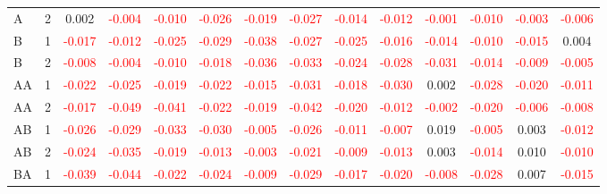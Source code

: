 \begin{table}[H]
{\begin{tabular}{llcccccccccccc}
A & 2 & 0.002 & \textcolor{red}{-0.004} & \textcolor{red}{-0.010} & \textcolor{red}{-0.026} & \textcolor{red}{-0.019} & \textcolor{red}{-0.027} & \textcolor{red}{-0.014} & \textcolor{red}{-0.012} & \textcolor{red}{-0.001} & \textcolor{red}{-0.010} & \textcolor{red}{-0.003} & \textcolor{red}{-0.006}\\
B & 1 & \textcolor{red}{-0.017} & \textcolor{red}{-0.012} & \textcolor{red}{-0.025} & \textcolor{red}{-0.029} & \textcolor{red}{-0.038} & \textcolor{red}{-0.027} & \textcolor{red}{-0.025} & \textcolor{red}{-0.016} & \textcolor{red}{-0.014} & \textcolor{red}{-0.010} & \textcolor{red}{-0.015} & 0.004\\
B & 2 & \textcolor{red}{-0.008} & \textcolor{red}{-0.004} & \textcolor{red}{-0.010} & \textcolor{red}{-0.018} & \textcolor{red}{-0.036} & \textcolor{red}{-0.033} & \textcolor{red}{-0.024} & \textcolor{red}{-0.028} & \textcolor{red}{-0.031} & \textcolor{red}{-0.014} & \textcolor{red}{-0.009} & \textcolor{red}{-0.005}\\
AA & 1 & \textcolor{red}{-0.022} & \textcolor{red}{-0.025} & \textcolor{red}{-0.019} & \textcolor{red}{-0.022} & \textcolor{red}{-0.015} & \textcolor{red}{-0.031} & \textcolor{red}{-0.018} & \textcolor{red}{-0.030} & 0.002 & \textcolor{red}{-0.028} & \textcolor{red}{-0.020} & \textcolor{red}{-0.011}\\
AA & 2 & \textcolor{red}{-0.017} & \textcolor{red}{-0.049} & \textcolor{red}{-0.041} & \textcolor{red}{-0.022} & \textcolor{red}{-0.019} & \textcolor{red}{-0.042} & \textcolor{red}{-0.020} & \textcolor{red}{-0.012} & \textcolor{red}{-0.002} & \textcolor{red}{-0.020} & \textcolor{red}{-0.006} & \textcolor{red}{-0.008}\\
AB & 1 & \textcolor{red}{-0.026} & \textcolor{red}{-0.029} & \textcolor{red}{-0.033} & \textcolor{red}{-0.030} & \textcolor{red}{-0.005} & \textcolor{red}{-0.026} & \textcolor{red}{-0.011} & \textcolor{red}{-0.007} & 0.019 & \textcolor{red}{-0.005} & 0.003 & \textcolor{red}{-0.012}\\
AB & 2 & \textcolor{red}{-0.024} & \textcolor{red}{-0.035} & \textcolor{red}{-0.019} & \textcolor{red}{-0.013} & \textcolor{red}{-0.003} & \textcolor{red}{-0.021} & \textcolor{red}{-0.009} & \textcolor{red}{-0.013} & 0.003 & \textcolor{red}{-0.014} & 0.010 & \textcolor{red}{-0.010}\\
BA & 1 & \textcolor{red}{-0.039} & \textcolor{red}{-0.044} & \textcolor{red}{-0.022} & \textcolor{red}{-0.024} & \textcolor{red}{-0.009} & \textcolor{red}{-0.029} & \textcolor{red}{-0.017} & \textcolor{red}{-0.020} & \textcolor{red}{-0.008} & \textcolor{red}{-0.028} & 0.007 & \textcolor{red}{-0.015}\\

\end{tabular}}
\end{table}
